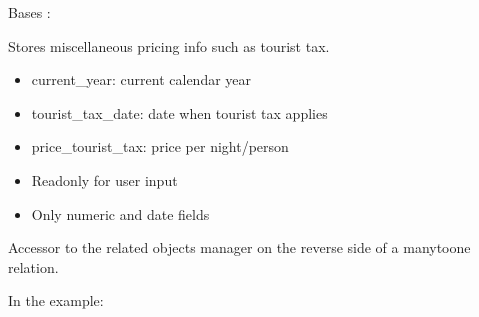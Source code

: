 \documentclass[letterpaper,10pt,french]{sphinxmanual}
\begin{document}
\begin{fulllineitems}
\label{\detokenize{index:bookings.models.OtherPrice}}
\pysigstartsignatures
\pysiglinewithargsret
{}
{\sphinxparamcomma {}}
{}
\pysigstopsignatures
\sphinxAtStartPar
Bases : 

\sphinxAtStartPar
Stores miscellaneous pricing info such as tourist tax.
\begin{description}
\begin{itemize}
\item {} 
\sphinxAtStartPar
current\_year: current calendar year

\item {} 
\sphinxAtStartPar
tourist\_tax\_date: date when tourist tax applies

\item {} 
\sphinxAtStartPar
price\_tourist\_tax: price per night/person

\end{itemize}

\begin{itemize}
\item {} 
\sphinxAtStartPar
Read\sphinxhyphen{}only for user input

\item {} 
\sphinxAtStartPar
Only numeric and date fields

\end{itemize}

\end{description}

\begin{fulllineitems}
\label{\detokenize{index:bookings.models.OtherPrice.translations}}
\pysigstartsignatures
\pysigline
{}
\pysigstopsignatures
\sphinxAtStartPar
Accessor to the related objects manager on the reverse side of a
many\sphinxhyphen{}to\sphinxhyphen{}one relation.

\sphinxAtStartPar
In the example:

\begin{sphinxVerbatim}[commandchars=\\\{\}]
       
\end{sphinxVerbatim}


\end{fulllineitems}
\end{fulllineitems}
\end{document}
